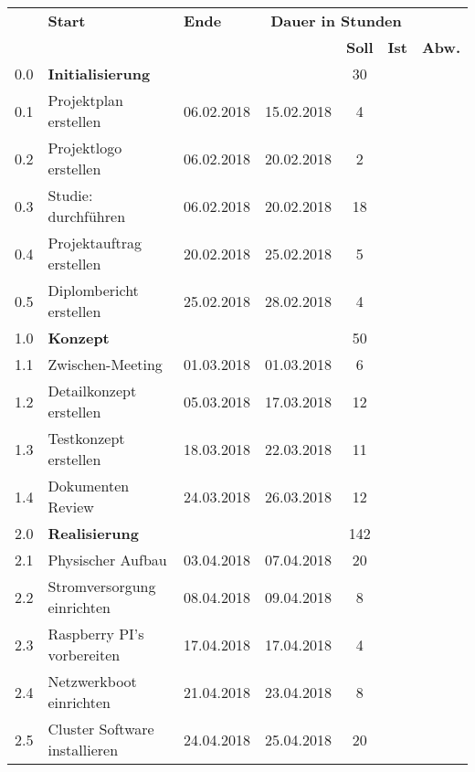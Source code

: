 \begin{table}[H]
\begin{tabular}{|p{0.7cm}p{6.8cm}p{2cm}p{2cm}|c|c|c|}
\hline
\rowcolor{heading}\multicolumn{2}{l}{\textbf{Aufgabe}} & \textbf{Start} & \textbf{Ende} & \multicolumn{3}{c|}{\textbf{Dauer in Stunden}} \\\cline{5-7} 
\rowcolor{heading}& & & & \textbf{Soll} & \textbf{Ist} & \textbf{Abw.} \\\hline
\rowcolor{subheading} 0.0 & \textbf{Initialisierung} & & & 30 & & \\\hline
0.1 & Projektplan erstellen & 06.02.2018 & 15.02.2018  & 4 & & \\\hline
0.2 & Projektlogo erstellen & 06.02.2018 & 20.02.2018 & 2 & &\\\hline
0.3 & Studie: durchführen   & 06.02.2018 & 20.02.2018 & 18 & &\\\hline
0.4 & Projektauftrag erstellen & 20.02.2018 & 25.02.2018 & 5 & &\\\hline
0.5 & Diplombericht erstellen  & 25.02.2018 & 28.02.2018 & 4 & &\\\hline
\rowcolor{subheading} 1.0 &\textbf{Konzept} & & & 50 & & \\\hline
1.1 & Zwischen-Meeting & 01.03.2018 & 01.03.2018 & 6 & &\\\hline
1.2 & Detailkonzept erstellen & 05.03.2018 & 17.03.2018 & 12 & & \\\hline
1.3 & Testkonzept erstellen & 18.03.2018 & 22.03.2018 & 11 & &\\\hline
1.4 & Dokumenten Review & 24.03.2018 & 26.03.2018  & 12 & & \\\hline
\hline
\rowcolor{subheading} 2.0 & \textbf{Realisierung} & & & 142 & & \\\hline
2.1 & Physischer Aufbau & 03.04.2018 & 07.04.2018 & 20  & & \\\hline
2.2 & Stromversorgung einrichten & 08.04.2018 & 09.04.2018  & 8 & & \\\hline
2.3 & Raspberry PI's vorbereiten & 17.04.2018 & 17.04.2018 & 4 & & \\\hline
2.4 & Netzwerkboot einrichten & 21.04.2018 & 23.04.2018 & 8 & & \\\hline
2.5 & Cluster Software installieren & 24.04.2018 & 25.04.2018 & 20 & &  \\\hline

\end{tabular}
\end{table}
